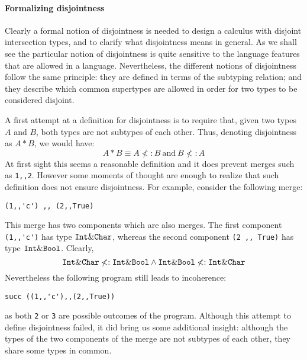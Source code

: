 \paragraph{Formalizing disjointness} 
Clearly a formal notion of disjointness is needed to design a
calculus with disjoint intersection types, and to clarify what
disjointness means in general.
As we shall see the particular notion of disjointness is quite
sensitive to the language features that are allowed in a language.
Nevertheless, the different notions of disjointness follow the same
principle: they are defined in terms of the subtyping relation; and
they describe which common supertypes are allowed in order for 
two types to be considered disjoint.

A first attempt at a definition for disjointness is to require that,
given two types $A$ and $B$, both types are not subtypes of each
other. Thus, denoting disjointness as $A * B$, we would have:
\[A * B \equiv A \not<: B~\text{and}~B \not<: A\]
At first sight this seems a reasonable definition and it does prevent
merges such as \lstinline{1,,2}. However some moments of thought are enough to realize that
such definition does not ensure disjointness. For example, consider
the following merge:

\begin{lstlisting}
(1,,'c') ,, (2,,True)
\end{lstlisting}

\noindent This merge has two components which are also merges. 
The first component \lstinline{(1,,'c')} has type $\texttt{Int} \&
\texttt{Char}$, whereas the second component \lstinline{(2 ,, True)} has type
$\texttt{Int} \& \texttt{Bool}$. Clearly,
\[ \texttt{Int} \& \texttt{Char} \not <: \texttt{Int} \& \texttt{Bool} \wedge \texttt{Int} \& \texttt{Bool} \not <: \texttt{Int} \& \texttt{Char} \]
Nevertheless the following program still leads to
incoherence:
\begin{lstlisting}
succ ((1,,'c'),,(2,,True))
\end{lstlisting}
as both \lstinline{2} or \lstinline{3} are possible outcomes
of the program. Although this attempt to define disjointness failed,
it did bring us some additional insight: although the types of the two
components of the merge are not subtypes of each other, they share
some types in common.

